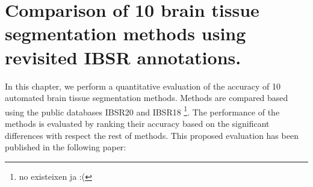 
\chapter{Comparison of 10 brain tissue segmentation methods using revisited IBSR annotations.}  
\label{chapter:chapter_2}

In this chapter, we perform a quantitative evaluation of the accuracy of 10 automated brain tissue segmentation methods. Methods are compared based using the public databases IBSR20 and IBSR18 \footnote{no existeixen ja :(}. The performance of the methods is evaluated by ranking their accuracy based on the significant differences with respect the rest of methods. This proposed evaluation has been published in the following paper:

\vspace{2cm}

\noindent{}





